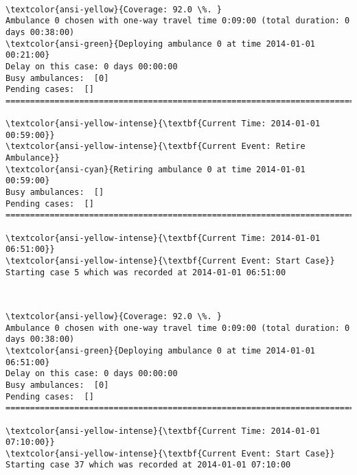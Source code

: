 \documentclass[11pt]{article}
\begin{document}
    \begin{center}
    \end{center}
    { \hspace*{\fill} \\}
    
    \begin{Verbatim}[commandchars=\\\{\}]
\textcolor{ansi-yellow}{Coverage: 92.0 \%. }
Ambulance 0 chosen with one-way travel time 0:09:00 (total duration: 0 days 00:38:00)
\textcolor{ansi-green}{Deploying ambulance 0 at time 2014-01-01 00:21:00}
Delay on this case: 0 days 00:00:00
Busy ambulances:  [0]
Pending cases:  []
========================================================================

\textcolor{ansi-yellow-intense}{\textbf{Current Time: 2014-01-01 00:59:00}}
\textcolor{ansi-yellow-intense}{\textbf{Current Event: Retire Ambulance}}
\textcolor{ansi-cyan}{Retiring ambulance 0 at time 2014-01-01 00:59:00}
Busy ambulances:  []
Pending cases:  []
========================================================================

\textcolor{ansi-yellow-intense}{\textbf{Current Time: 2014-01-01 06:51:00}}
\textcolor{ansi-yellow-intense}{\textbf{Current Event: Start Case}}
Starting case 5 which was recorded at 2014-01-01 06:51:00

    \end{Verbatim}

    \begin{center}
    \end{center}
    { \hspace*{\fill} \\}
    
    \begin{Verbatim}[commandchars=\\\{\}]
\textcolor{ansi-yellow}{Coverage: 92.0 \%. }
Ambulance 0 chosen with one-way travel time 0:09:00 (total duration: 0 days 00:38:00)
\textcolor{ansi-green}{Deploying ambulance 0 at time 2014-01-01 06:51:00}
Delay on this case: 0 days 00:00:00
Busy ambulances:  [0]
Pending cases:  []
========================================================================

\textcolor{ansi-yellow-intense}{\textbf{Current Time: 2014-01-01 07:10:00}}
\textcolor{ansi-yellow-intense}{\textbf{Current Event: Start Case}}
Starting case 37 which was recorded at 2014-01-01 07:10:00

    \end{Verbatim}
\end{document}
